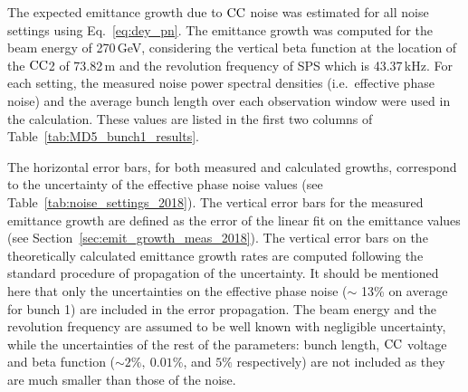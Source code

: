 The expected emittance growth due to ${\mathrm{CC}}$ noise was estimated for all noise settings using Eq.~\eqref{eq:dey_pn}. The emittance growth was computed for the beam energy of 270\,GeV, considering the vertical beta function at the location of the ${\mathrm{CC}}$2 of 73.82\,m and the revolution frequency of SPS which is 43.37\,kHz. For each setting, the measured noise power spectral densities (i.e.~effective phase noise) and the average bunch length over each observation window were used in the calculation. These values are listed in the first two columns of Table~\ref{tab:MD5_bunch1_results}.

The horizontal error bars, for both measured and calculated growths, correspond to the uncertainty of the effective phase noise values (see Table~\ref{tab:noise_settings_2018}). The vertical error bars for the measured emittance growth are defined as the error of the linear fit on the emittance values (see Section~\ref{sec:emit_growth_meas_2018}). The vertical error bars on the theoretically calculated emittance growth rates are computed following the standard procedure of propagation of the uncertainty. It should be mentioned here that only the uncertainties on the effective phase noise ($\sim$ 13\% on average for bunch 1) are included in the error propagation. The beam energy and the revolution frequency are assumed to be well known with negligible uncertainty, while the uncertainties of the rest of the parameters: bunch length, ${\mathrm{CC}}$ voltage and beta function ($\sim 2 \%, \ 0.01 \%$, and $5 \%$ respectively) are not included as they are much smaller than those of the noise.




